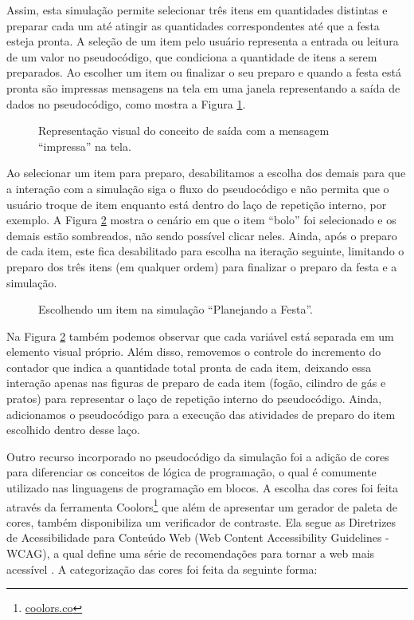 Assim, esta simulação permite selecionar três itens em quantidades distintas e preparar cada um até atingir as quantidades correspondentes até que a festa esteja pronta. A seleção de um item pelo usuário representa a entrada ou leitura de um valor no pseudocódigo, que condiciona a quantidade de itens a serem preparados. Ao escolher um item ou finalizar o seu preparo e quando a festa está pronta são impressas mensagens na tela em uma janela representando a saída de dados no pseudocódigo, como mostra a Figura \ref{figure:saida}. 

\begin{figure}[h!]
    \centering
    \setlength{\fboxrule}{0.1pt} %
    \caption{Representação visual do conceito de saída com a mensagem \enquote{impressa} na tela.}
    \label{figure:saida}
\end{figure}

Ao selecionar um item para preparo, desabilitamos a escolha dos demais para que a interação com a simulação siga o fluxo do pseudocódigo e não permita que o usuário troque de item enquanto está dentro do laço de repetição interno, por exemplo. A Figura \ref{figure:item_escolhido} mostra o cenário em que o item \enquote{bolo} foi selecionado e os demais estão sombreados, não sendo possível clicar neles. Ainda, após o preparo de cada item, este fica desabilitado para escolha na iteração seguinte, limitando o preparo dos três itens (em qualquer ordem) para finalizar o preparo da festa e a simulação.

\begin{figure}[h!]
    \centering
    \setlength{\fboxrule}{0.1pt} %
    \caption{Escolhendo um item na simulação \enquote{Planejando a Festa}.}
    \label{figure:item_escolhido}
\end{figure}

Na Figura \ref{figure:item_escolhido} também podemos observar que cada variável está separada em um elemento visual próprio. Além disso, removemos o controle do incremento do contador que indica a quantidade total pronta de cada item, deixando essa interação apenas nas figuras de preparo de cada item (fogão, cilindro de gás e pratos) para representar o laço de repetição interno do pseudocódigo. Ainda, adicionamos o pseudocódigo para a execução das atividades de preparo do item escolhido dentro desse laço.

Outro recurso incorporado no pseudocódigo da simulação foi a adição de cores para diferenciar os conceitos de lógica de programação, o qual é comumente utilizado nas linguagens de programação em blocos. A escolha das cores foi feita através da ferramenta Coolors\footnote{\url{coolors.co}} que além de apresentar um gerador de paleta de cores, também disponibiliza um verificador de contraste. Ela segue as Diretrizes de Acessibilidade para Conteúdo Web (Web Content Accessibility Guidelines - WCAG), a qual define uma série de recomendações para tornar a web mais acessível \citep{caldwell2008web}. A categorização das cores foi feita da seguinte forma:

